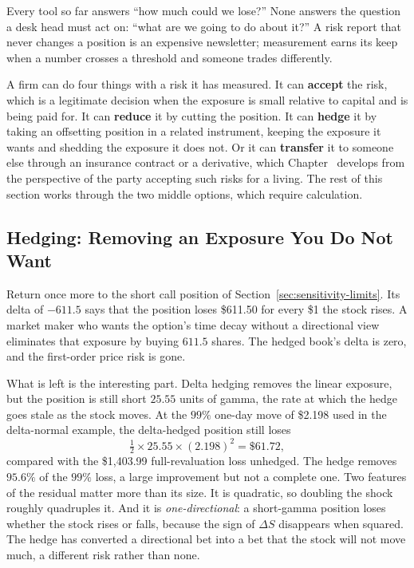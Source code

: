 \documentclass[../ai_in_finance]{subfiles}
\begin{document}
Every tool so far answers ``how much could we lose?'' None answers the question a desk head must act on: ``what are we going to do about it?'' A risk report that never changes a position is an expensive newsletter; measurement earns its keep when a number crosses a threshold and someone trades differently.

A firm can do four things with a risk it has measured. It can \textbf{accept} the risk, which is a legitimate decision when the exposure is small relative to capital and is being paid for. It can \textbf{reduce} it by cutting the position. It can \textbf{hedge} it by taking an offsetting position in a related instrument, keeping the exposure it wants and shedding the exposure it does not. Or it can \textbf{transfer} it to someone else through an insurance contract or a derivative, which Chapter~ develops from the perspective of the party accepting such risks for a living. The rest of this section works through the two middle options, which require calculation.

\subsection{Hedging: Removing an Exposure You Do Not Want}
\label{sec:hedging}

Return once more to the short call position of Section~\ref{sec:sensitivity-limits}. Its delta of $-611.5$ says that the position loses \$611.50 for every \$1 the stock rises. A market maker who wants the option's time decay without a directional view eliminates that exposure by buying $611.5$ shares. The hedged book's delta is zero, and the first-order price risk is gone.

What is left is the interesting part. Delta hedging removes the linear exposure, but the position is still short $25.55$ units of gamma, the rate at which the hedge goes stale as the stock moves. At the $99\%$ one-day move of \$2.198 used in the delta-normal example, the delta-hedged position still loses
\begin{equation*}
\tfrac{1}{2} \times 25.55 \times (2.198)^2 = \$61.72,
\end{equation*}
compared with the \$1,403.99 full-revaluation loss unhedged. The hedge removes $95.6\%$ of the $99\%$ loss, a large improvement but not a complete one. Two features of the residual matter more than its size. It is quadratic, so doubling the shock roughly quadruples it. And it is \emph{one-directional}: a short-gamma position loses whether the stock rises or falls, because the sign of $\Delta S$ disappears when squared. The hedge has converted a directional bet into a bet that the stock will not move much, a different risk rather than none.
\end{document}
